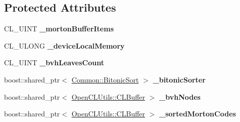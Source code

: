\subsection*{Protected Attributes}
\begin{DoxyCompactItemize}
\item 
C\+L\+\_\+\+U\+I\+NT {\bfseries \+\_\+morton\+Buffer\+Items}\hypertarget{class_c_l_ray_tracer_1_1_acceleration_structures_1_1_b_v_h_manager_a0860ba563afc7145e63b96657372f448}{}\label{class_c_l_ray_tracer_1_1_acceleration_structures_1_1_b_v_h_manager_a0860ba563afc7145e63b96657372f448}

\item 
C\+L\+\_\+\+U\+L\+O\+NG {\bfseries \+\_\+device\+Local\+Memory}\hypertarget{class_c_l_ray_tracer_1_1_acceleration_structures_1_1_b_v_h_manager_aafff3e0424c27db3cad4e90153459a1b}{}\label{class_c_l_ray_tracer_1_1_acceleration_structures_1_1_b_v_h_manager_aafff3e0424c27db3cad4e90153459a1b}

\item 
C\+L\+\_\+\+U\+I\+NT {\bfseries \+\_\+bvh\+Leaves\+Count}\hypertarget{class_c_l_ray_tracer_1_1_acceleration_structures_1_1_b_v_h_manager_a26cbdacbf7d0be22160438df6dcf5616}{}\label{class_c_l_ray_tracer_1_1_acceleration_structures_1_1_b_v_h_manager_a26cbdacbf7d0be22160438df6dcf5616}

\item 
boost\+::shared\+\_\+ptr$<$ \hyperlink{class_c_l_ray_tracer_1_1_common_1_1_bitonic_sort}{Common\+::\+Bitonic\+Sort} $>$ {\bfseries \+\_\+bitonic\+Sorter}\hypertarget{class_c_l_ray_tracer_1_1_acceleration_structures_1_1_b_v_h_manager_a687c33b2d71e8b5e5bcbface128b5719}{}\label{class_c_l_ray_tracer_1_1_acceleration_structures_1_1_b_v_h_manager_a687c33b2d71e8b5e5bcbface128b5719}

\item 
boost\+::shared\+\_\+ptr$<$ \hyperlink{class_c_l_ray_tracer_1_1_open_c_l_utils_1_1_c_l_buffer}{Open\+C\+L\+Utils\+::\+C\+L\+Buffer} $>$ {\bfseries \+\_\+bvh\+Nodes}\hypertarget{class_c_l_ray_tracer_1_1_acceleration_structures_1_1_b_v_h_manager_a9ea330778738a1e467c234e5c04edd9d}{}\label{class_c_l_ray_tracer_1_1_acceleration_structures_1_1_b_v_h_manager_a9ea330778738a1e467c234e5c04edd9d}

\item 
boost\+::shared\+\_\+ptr$<$ \hyperlink{class_c_l_ray_tracer_1_1_open_c_l_utils_1_1_c_l_buffer}{Open\+C\+L\+Utils\+::\+C\+L\+Buffer} $>$ {\bfseries \+\_\+sorted\+Morton\+Codes}\hypertarget{class_c_l_ray_tracer_1_1_acceleration_structures_1_1_b_v_h_manager_aa1dbd2e89b8079f7ba8c82030f1f338d}{}\label{class_c_l_ray_tracer_1_1_acceleration_structures_1_1_b_v_h_manager_aa1dbd2e89b8079f7ba8c82030f1f338d}


\end{DoxyCompactItemize}
